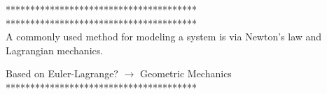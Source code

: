 \documentclass[a4paper,11pt]{mscThesis}
\begin{document}
	    ***************************************\\
	    
	    
	    
	    ***************************************\\
	    A commonly used method for modeling a system is via Newton's law and Lagrangian mechanics. 
	    
	    Based on Euler-Lagrange? $ \rightarrow $ Geometric Mechanics\\
	   
	    ***************************************\\
		

	    
	    
	    
	    
\end{document}
